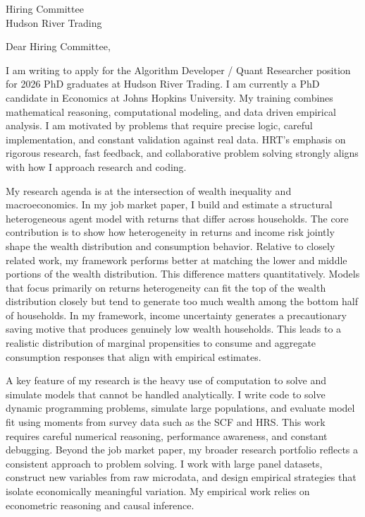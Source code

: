 \documentclass[11pt]{letter}
\begin{document}
\begin{letter}{Hiring Committee \\ Hudson River Trading}

\opening{Dear Hiring Committee,}

I am writing to apply for the Algorithm Developer / Quant Researcher position for 2026 PhD graduates at Hudson River Trading. I am currently a PhD candidate in Economics at Johns Hopkins University. My training combines mathematical reasoning, computational modeling, and data driven empirical analysis. I am motivated by problems that require precise logic, careful implementation, and constant validation against real data. HRT’s emphasis on rigorous research, fast feedback, and collaborative problem solving strongly aligns with how I approach research and coding.

My research agenda is at the intersection of wealth inequality and macroeconomics. In my job market paper, I build and estimate a structural heterogeneous agent model with returns that differ across households. The core contribution is to show how heterogeneity in returns and income risk jointly shape the wealth distribution and consumption behavior. Relative to closely related work, my framework performs better at matching the lower and middle portions of the wealth distribution. This difference matters quantitatively. Models that focus primarily on returns heterogeneity can fit the top of the wealth distribution closely but tend to generate too much wealth among the bottom half of households. In my framework, income uncertainty generates a precautionary saving motive that produces genuinely low wealth households. This leads to a realistic distribution of marginal propensities to consume and aggregate consumption responses that align with empirical estimates.

A key feature of my research is the heavy use of computation to solve and simulate models that cannot be handled analytically. I write code to solve dynamic programming problems, simulate large populations, and evaluate model fit using moments from survey data such as the SCF and HRS. This work requires careful numerical reasoning, performance awareness, and constant debugging. Beyond the job market paper, my broader research portfolio reflects a consistent approach to problem solving. I work with large panel datasets, construct new variables from raw microdata, and design empirical strategies that isolate economically meaningful variation. My empirical work relies on econometric reasoning and causal inference.


\end{letter}
\end{document}
